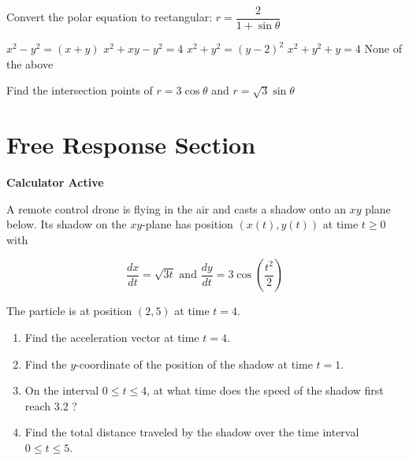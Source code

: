 \documentclass[11pt]{exam}
\begin{document}
\begin{questions}
\begin{minipage}{\linewidth}
\question Convert the polar equation to rectangular: $r = \dfrac{2}{1 + \sin \theta}$

\begin{choices}
	\choice $x^2 - y^2 = (x+y)$
	\choice $x^2 + xy - y^2 = 4$
	\correctchoice $x^2 + y^2 = (y-2)^2$
	\choice $x^2+y^2 + y = 4$
	\choice None of the above
\end{choices} \answerline
\end{minipage}

\begin{minipage}{\linewidth}


\question Find the intersection points of $r = 3 \cos \theta$ and $r = \sqrt3 \sin \theta$

\begin{choices}
\end{choices} \answerline
\end{minipage}

\end{questions}

\clearpage
\section*{Free Response Section}
\noindent
\textbf{Calculator Active}
\vspace{2ex}

A remote control drone is flying in the air and casts a shadow onto
an $xy$ plane below. Its shadow on the $x y$-plane has position $(x(t), y(t))$ at time $t \geq 0$ with

$$
\frac{d x}{d t}=\sqrt{3 t} \text { and } \frac{d y}{d t}=3 \cos \left(\frac{t^{2}}{2}\right)
$$

The particle is at position $(2,5)$ at time $t=4$.
\begin{enumerate}
\item Find the acceleration vector at time $t=4$.
\vspace{1in}
\item Find the $y$-coordinate of the position of the shadow at time $t=1$.
\vspace{1in}
\item On the interval $0 \leq t \leq 4$, at what time does the speed of the shadow first reach 3.2 ?
\vspace{2in}
\item Find the total distance traveled by the shadow over the time interval $0 \leq t \leq 5$.
\end{enumerate}
\end{document}
